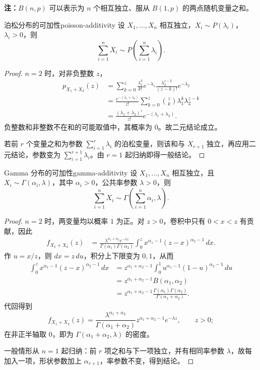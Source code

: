 \textbf{注：}\quad $B(n,p)$ 可以表示为 $n$ 个相互独立、服从 $B(1,p)$ 的两点随机变量之和。

\begin{mytheorem}{泊松分布的可加性}{poisson-additivity}
设 $X_1,\ldots,X_n$ 相互独立，$X_i\sim P(\lambda_i)$，$\lambda_i>0$，则
\[
\sum_{i=1}^nX_i\sim P\left(\sum_{i=1}^n\lambda_i\right).
\]
\end{mytheorem}
\begin{proof}
$n=2$ 时，对非负整数 $z$，
\begin{align*}
p_{X_1+X_2}(z)
&=\sum_{k=0}^z\frac{\lambda_1^k}{k!}e^{-\lambda_1}
 \frac{\lambda_2^{z-k}}{(z-k)!}e^{-\lambda_2}\\
&=\frac{e^{-(\lambda_1+\lambda_2)}}{z!}
  \sum_{k=0}^z\binom zk\lambda_1^k\lambda_2^{z-k}\\
&=\frac{(\lambda_1+\lambda_2)^z}{z!}e^{-(\lambda_1+\lambda_2)}.
\end{align*}
负整数和非整数不在和的可能取值中，其概率为 $0$。故二元结论成立。

若前 $r$ 个变量之和为参数 $\sum_{i=1}^r\lambda_i$ 的泊松变量，则该和与 $X_{r+1}$ 独立，再应用二元结论，参数变为 $\sum_{i=1}^{r+1}\lambda_i$。由 $r=1$ 起归纳即得一般结论。
\end{proof}

\begin{mytheorem}{Gamma 分布的可加性}{gamma-additivity}
设 $X_1,\ldots,X_n$ 相互独立，且 $X_i\sim\Gamma(\alpha_i,\lambda)$，其中 $\alpha_i>0$，公共率参数 $\lambda>0$，则
\[
\sum_{i=1}^nX_i\sim\Gamma\left(\sum_{i=1}^n\alpha_i,\lambda\right).
\]
\end{mytheorem}
\begin{proof}
$n=2$ 时，两变量均以概率 $1$ 为正。对 $z>0$，卷积中只有 $0<x<z$ 有贡献，因此
\begin{align*}
f_{X_1+X_2}(z)
&=\frac{\lambda^{\alpha_1+\alpha_2}e^{-\lambda z}}
 {\Gamma(\alpha_1)\Gamma(\alpha_2)}
 \int_0^z x^{\alpha_1-1}(z-x)^{\alpha_2-1}\,dx.
\end{align*}
作 $u=x/z$，则 $dx=z\,du$，积分上下限变为 $0,1$，从而
\begin{align*}
\int_0^z x^{\alpha_1-1}(z-x)^{\alpha_2-1}\,dx
&=z^{\alpha_1+\alpha_2-1}
 \int_0^1u^{\alpha_1-1}(1-u)^{\alpha_2-1}\,du\\
&=z^{\alpha_1+\alpha_2-1}B(\alpha_1,\alpha_2)\\
&=z^{\alpha_1+\alpha_2-1}
 \frac{\Gamma(\alpha_1)\Gamma(\alpha_2)}
 {\Gamma(\alpha_1+\alpha_2)}.
\end{align*}
代回得到
\[
f_{X_1+X_2}(z)=
\frac{\lambda^{\alpha_1+\alpha_2}}{\Gamma(\alpha_1+\alpha_2)}
 z^{\alpha_1+\alpha_2-1}e^{-\lambda z},\qquad z>0;
\]
在非正半轴取 $0$，即为 $\Gamma(\alpha_1+\alpha_2,\lambda)$ 的密度。

一般情形从 $n=1$ 起归纳：前 $r$ 项之和与下一项独立，并有相同率参数 $\lambda$，故每加入一项，形状参数加上 $\alpha_{r+1}$，率参数不变，得到结论。
\end{proof}

